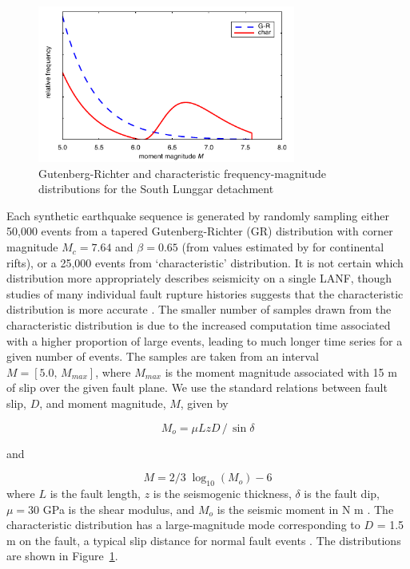 \documentclass[draft,grl]{AGUTeX}
\begin{document}
\begin{article}
\begin{figure}[b]
\noindent\includegraphics[width=20pc]{./figures/F-Ms.pdf}
\caption{Gutenberg-Richter and characteristic frequency-magnitude 
 		 distributions for the South Lunggar detachment}
\label{fig:fms}
\end{figure}

Each synthetic earthquake sequence is generated by randomly sampling either
50,000 events from a tapered Gutenberg-Richter (GR) distribution with corner
magnitude $M_c = 7.64$ and $\beta = 0.65$ (from values estimated by
\citet{birdkagan2004f_m} for continental rifts), or a 25,000 events from
`characteristic' distribution. It is not certain which distribution more
appropriately describes seismicity on a single LANF, though studies of many
individual fault rupture histories suggests that the characteristic
distribution is more accurate \citep[e.g.,]{hecker2013eqdist}.  The smaller
number of samples drawn from the characteristic distribution is due to the
increased computation time associated with a higher proportion of large events,
leading to much longer time series for a given number of events.  The samples
are taken from an interval $M = [5.0, \, M_{max}]$, where $M_{max}$ is the
moment magnitude associated with 15 m of slip over the given fault plane.  We
use the standard relations between fault slip, $D$, and moment magnitude, $M$,
given by

\begin{equation}
 M_o = \mu L z D \,/ \, \sin \delta 
 \end{equation}

and

\begin{equation}
M = 2/3 \; \log_{10} (M_o) - 6
\end{equation}
where $L$ is the fault length, $z$ is the seismogenic thickness, $\delta$ is
the fault dip, $\mu = 30$ GPa is the shear modulus, and $M_o$ is the seismic
moment in N m \citep[e.g.,][]{akirichards2002, kagan2003pepi}.  The
characteristic distribution has a large-magnitude mode corresponding to $D$
= 1.5 m on the fault, a typical slip distance for normal fault events
\citep[e.g.][]{wesnousky2008displacement}.  The distributions are shown in
Figure~\ref{fig:fms}.


\end{article}
\end{document}
